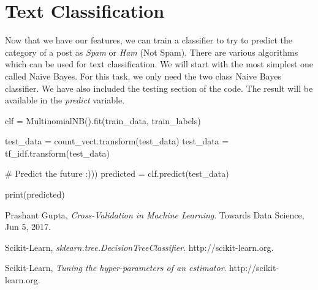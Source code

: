 \documentclass[12pt]{article}
\numberwithin{equation}{section}
\numberwithin{table}{section}
\numberwithin{figure}{section}
\begin{document}
\section{Text Classification}
Now that we have our features, we can train a classifier to try to predict the category of a post as \textit{Spam} or \textit{Ham} (Not Spam). There are various algorithms which can be used for text classification. We will start with the most simplest one called Naive Bayes. For this task, we only need the two class Naive Bayes classifier. We have also included the testing section of the code. The result will be available in the \textit{predict} variable.
\begin{python}
	clf = MultinomialNB().fit(train_data, train_labels)
	
	test_data = count_vect.transform(test_data)
	test_data = tf_idf.transform(test_data)
	
	# Predict the future :)))
	predicted = clf.predict(test_data)
	
	print(predicted)
\end{python}
\begin{thebibliography}{999}
	
	Prashant Gupta,
	\emph{Cross-Validation in Machine Learning}.
	Towards Data Science,
	Jun 5, 2017.
	
	Scikit-Learn,
	\emph{sklearn.tree.DecisionTreeClassifier}.
	http://scikit-learn.org.
	
	Scikit-Learn,
	\emph{Tuning the hyper-parameters of an estimator}.
	http://scikit-learn.org.
	
\end{thebibliography}
\end{document}
